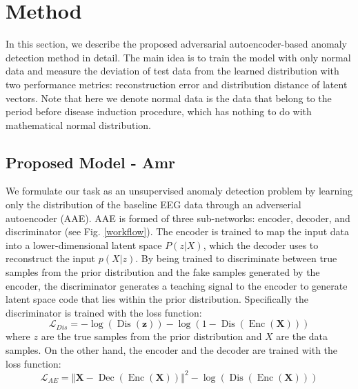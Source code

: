 \documentclass[pmlr]{jmlr}%
\begin{document}
\section{Method}
In this section, we describe the proposed adversarial autoencoder-based anomaly detection method in detail. The main idea is to train the model with only normal data and measure the deviation of test data from the learned distribution with two performance metrics: reconstruction error and distribution distance of latent vectors. Note that here we denote normal data is the data that belong to the period before disease induction procedure, which has nothing to do with mathematical normal distribution.

\subsection{Proposed Model - Amr}
We formulate our task as an unsupervised anomaly detection problem by learning only the distribution of the baseline EEG data through an adverserial autoencoder (AAE). AAE is formed of three sub-networks: encoder, decoder, and discriminator (see Fig. \ref{workflow}). The encoder is trained to map the input data into a lower-dimensional latent space $P(z|X)$, which the decoder uses to reconstruct the input $p(X|z)$. By being trained to discriminate between true samples from the prior distribution and the fake samples generated by the encoder, the discriminator generates a teaching signal to the encoder to generate latent space code that lies within the prior distribution. Specifically the discriminator is trained with the loss function:
\begin{equation}
\mathcal{L}_{D i s}=-\log (\operatorname{Dis}(\mathbf{z}))-\log (1-\operatorname{Dis}(\operatorname{Enc}(\mathbf{X})))
\end{equation}
where $z$ are the true samples from the prior distribution and $X$ are the data samples. On the other hand, the encoder and the decoder are trained with the loss function:
\begin{equation}
\mathcal{L}_{AE}= \left\Vert \mathbf{X} - \operatorname{Dec}(\operatorname{Enc}(\mathbf{X})) \right\Vert^2 -\log (\operatorname{Dis}(\operatorname{Enc}(\mathbf{X})))
\end{equation}
\end{document}
